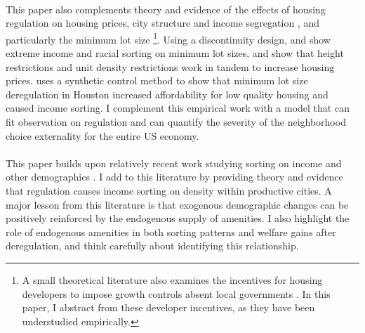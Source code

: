 \documentclass[12pt]{article}
\begin{document}
	
	\paragraph*{}
	This paper also complements theory and evidence of the effects of housing regulation on housing prices, city structure and income segregation \citep{MolloyRSUE, gyourkomolloy, turner2014, glaesergyourko2018, bruecknersingh, anagoletal2021, bbheight, mills2005, HILBER2013, op2014}, and particularly the minimum lot size \citep{zabel, Song, kulka, Cui, molloynathansonpaciorek, KSC, griesonwhite, WHITE1975}\footnote{A small theoretical literature also examines the incentives for housing developers to impose growth controls absent local governments \citep{helseystrangeGrowthControls, HendersonThisseDevelopers}. In this paper, I abstract from these developer incentives, as they have been understudied empirically.}. Using a discontinuity design, \cite{Song} and \cite{kulka} show extreme income and racial sorting on minimum lot sizes, and \cite{KSC} show that height restrictions and unit density restrictions work in tandem to increase housing prices. \cite{Mei} uses a synthetic control method to show that minimum lot size deregulation in Houston increased affordability for low quality housing and caused income sorting. I complement this empirical work with a model that can fit observation on regulation and can quantify the severity of the neighborhood choice externality for the entire US economy. 
	
	\paragraph*{}
	This paper builds upon relatively recent work studying sorting on income and other demographics \citep{diamond2016, bshartley2020, couturehandbury, Coutureetal, superstarcities, su2021, citysizewagegap, Gentrificationcycles, FogliGuerrieri, ccpoortransport, parispoor, LeeandLin}. I add to this literature by providing theory and evidence that regulation causes income sorting on density within productive cities. A major lesson from this literature is that exogenous demographic changes can be positively reinforced by the endogenous supply of amenities. I also highlight the role of endogenous amenities in both sorting patterns and welfare gains after deregulation, and think carefully about identifying this relationship.
	
\end{document}

